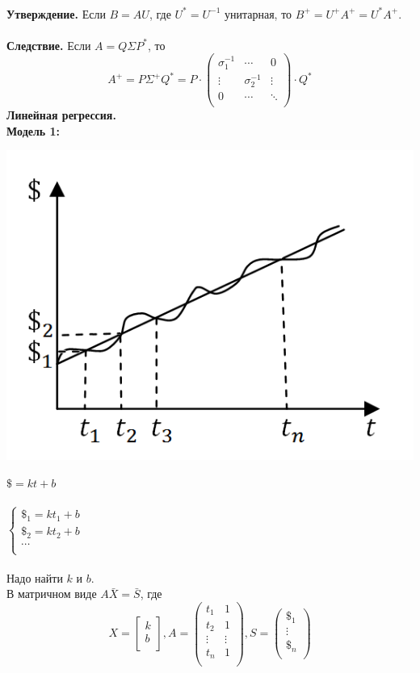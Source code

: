 \documentclass[12pt]{article}
\theoremstyle{definition}
\numberwithin{equation}{section}
\begin{document}
	\\
	\textbf{Утверждение.}
	Если $B=AU$, где $U^*=U^{-1}$ унитарная, то $B^+=U^+A^+=U^*A^+$.\\ \\
	\textbf{Следствие.}
	Если $A=Q\Sigma P^*$, то \[A^+=P\Sigma^+Q^*=P \cdot \begin{pmatrix}
	\sigma_1^{-1} & \cdots & 0 \\         
	\vdots & \sigma_2^{-1} & \vdots \\
	0 & \cdots & \ddots \\
	\end{pmatrix} \cdot Q^*\]
	\textbf{Линейная регрессия.}\\
	\textbf{Модель 1:}\begin{center}
		\includegraphics[scale=0.7]{l2_2.png}\end{center}
	$\$ = kt+b$\\ \\
	$
	\left\{  
	\begin{array}{ccl}  
	\$_1=kt_1+b\\
	\$_2=kt_2+b\\
	\cdots\\
	\end{array}   
	\right.  
	$\\ \\
	Надо найти $k$ и $b$.\\
	В матричном виде $A\bar X=\bar S$, где\\
	\[X = \begin{bmatrix}
	k\\         
	b\\
	\end{bmatrix}, A = \begin{pmatrix}
	t_1 & 1\\         
	t_2 & 1\\
	\vdots & \vdots\\
	t_n & 1\\
	\end{pmatrix}, S = \begin{pmatrix}
	\$_1\\         
	\vdots\\
	\$_n\\
	\end{pmatrix}\]\\
\end{document}
